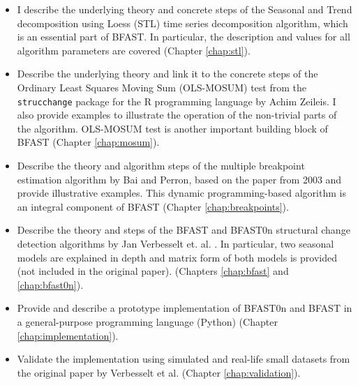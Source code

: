 \documentclass[main.tex]{subfiles}
\begin{document}
\begin{itemize}
\item I describe the underlying theory and concrete steps of the
  Seasonal and Trend decomposition using Loess (STL)
  time series decomposition algorithm, which is an essential part of BFAST.
  In particular, the description and values for all algorithm parameters are
  covered (Chapter \ref{chap:stl}).
\item Describe the underlying theory and link it to the concrete steps of
  the Ordinary Least Squares Moving Sum (OLS-MOSUM) test from the
  \texttt{strucchange} package \cite{strucchange} for the R programming
  language by Achim Zeileis. I also provide examples to illustrate the
  operation of the non-trivial parts of the algorithm. OLS-MOSUM test is another
  important building block of BFAST (Chapter \ref{chap:mosum}).
\item Describe the theory and algorithm steps of the multiple
  breakpoint estimation algorithm by Bai and Perron, based on the paper from 2003 \cite{bai_perron}
  and provide illustrative examples. This dynamic programming-based algorithm is
  an integral component of BFAST (Chapter \ref{chap:breakpoints}).
\item Describe the theory and steps of the BFAST and BFAST0n structural change
  detection algorithms by Jan Verbesselt et. al. \cite{bfast}. In particular,
  two seasonal models are explained in depth and matrix form of both models is
  provided (not included in the original paper).
  (Chapters \ref{chap:bfast} and \ref{chap:bfast0n}).
\item Provide and describe a prototype implementation of BFAST0n and BFAST in a
  general-purpose programming language (Python) (Chapter \ref{chap:implementation}).
\item Validate the implementation using simulated and real-life small
  datasets from the original paper by Verbesselt et al. \cite{bfast} (Chapter \ref{chap:validation}).
\end{itemize}

\biblio
\end{document}
